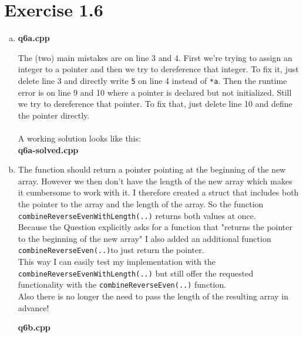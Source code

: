 \documentclass{article} %
\newcommand{\homeworkNumber}{1} %
\begin{document}
\section*{Exercise \homeworkNumber.6}
\begin{enumerate}[(a)]
\item
\textbf{q6a.cpp}
\lstset{language=C++}

The (two) main mistakes are on line 3 and 4. First we're trying to assign an integer to a pointer and then we try to dereference that integer. To fix it, just delete line 3 and directly write \verb|5| on line 4 instead of \verb|*a|.
Then the runtime error is on line 9 and 10 where a pointer is declared but not initialized. Still we try to dereference that pointer. To fix that, just delete line 10 and define the pointer directly.\\\\
A working solution looks like this:\\
\textbf{q6a-solved.cpp}
\lstset{language=C++}

\clearpage

\item
The function should return a pointer pointing at the beginning of the new array. However we then don't have the length of the new array which makes it cumbersome to work with it. I therefore created a struct that includes both the pointer to the array and the length of the array. So the function \verb|combineReverseEvenWithLength(..)| returns both values at once.\\
Because the Question explicitly asks for a function that "returns the pointer to the beginning of the new array" I also added an additional function \verb|combineReverseEven(..)|to just return the pointer.\\
This way I can easily test my implementation with the \verb|combineReverseEvenWithLength(..)| but still offer the requested functionality with the \verb|combineReverseEven(..)| function. \\
Also there is no longer the need to pass the length of the resulting array in advance!

\textbf{q6b.cpp}
\lstset{language=C++}

\clearpage


\end{enumerate}
\end{document}
